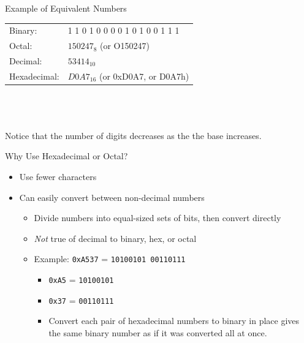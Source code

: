 \documentclass[graphics]{beamer}
\begin{document}
\begin{frame}{Example of Equivalent Numbers}
    \begin{tabular}{l l}
         Binary:      & 1 1 0 1 0 0 0 0 1 0 1 0 0 1 1 1  \\
         Octal:       & $150247_8$ (or O150247) \\
         Decimal:     & $53414_{10}$ \\
         Hexadecimal: & $D0A7_{16}$ (or 0xD0A7, or D0A7h)
    \end{tabular}
    \\ ~~ \\ ~~ \\
    Notice that the number of digits decreases as the the base increases.
\end{frame}

\begin{frame}{Why Use Hexadecimal or Octal?}
    \begin{itemize}
        \item Use fewer characters
        \item Can easily convert between non-decimal numbers
        \begin{itemize}
            \item Divide numbers into equal-sized sets of bits, then convert directly
            \item \textit{Not} true of decimal to binary, hex, or octal
            \item Example: \texttt{0xA537} = \texttt{10100101 00110111}
            \begin{itemize}
                \item \texttt{0xA5} = \texttt{10100101}
                \item \texttt{0x37} = \texttt{00110111}
                \item Convert each pair of hexadecimal numbers to binary in place gives the same binary number as if it was converted all at once.
            \end{itemize}
        \end{itemize}
    \end{itemize}
\end{frame}
\end{document}
